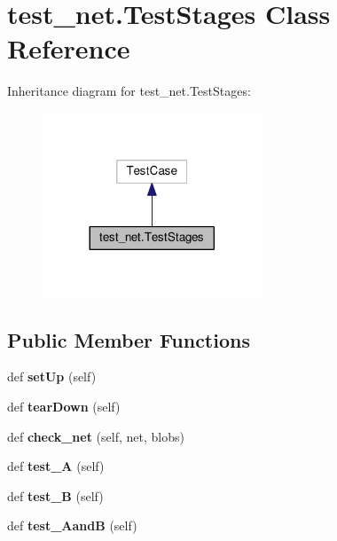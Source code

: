 \hypertarget{classtest__net_1_1_test_stages}{}\section{test\+\_\+net.\+Test\+Stages Class Reference}
\label{classtest__net_1_1_test_stages}


Inheritance diagram for test\+\_\+net.\+Test\+Stages\+:
\nopagebreak
\begin{figure}[H]
\begin{center}
\leavevmode
\includegraphics[width=185pt]{classtest__net_1_1_test_stages__inherit__graph}
\end{center}
\end{figure}
\subsection*{Public Member Functions}
\begin{DoxyCompactItemize}
\item 
\mbox{\label{classtest__net_1_1_test_stages_ac75cc4924817dae675241569d520ebb2}} 
def {\bfseries set\+Up} (self)
\item 
\mbox{\label{classtest__net_1_1_test_stages_acf4df154e5896ceed3f85565aa3bde9a}} 
def {\bfseries tear\+Down} (self)
\item 
\mbox{\label{classtest__net_1_1_test_stages_a0ae563c8ba724d2d9f25d3b7b33dabc1}} 
def {\bfseries check\+\_\+net} (self, net, blobs)
\item 
\mbox{\label{classtest__net_1_1_test_stages_aa6e825d941f16ce3b67fc5699a417ef4}} 
def {\bfseries test\+\_\+A} (self)
\item 
\mbox{\label{classtest__net_1_1_test_stages_aefa3cad6a4074cbb86b34309ab9ef1ce}} 
def {\bfseries test\+\_\+B} (self)
\item 
\mbox{\label{classtest__net_1_1_test_stages_adf58f1e91a61bc8361caa54e73b9dd44}} 
def {\bfseries test\+\_\+\+AandB} (self)
\end{DoxyCompactItemize}
